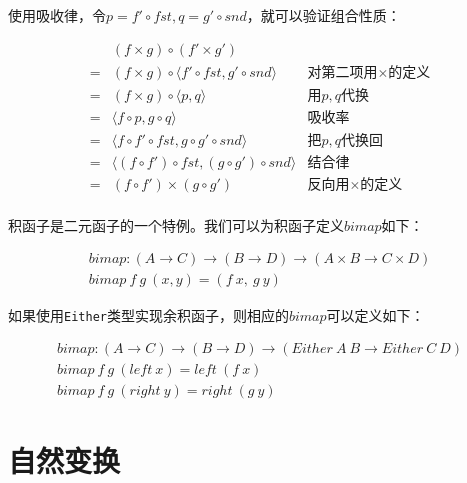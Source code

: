 \documentclass{article}
\begin{document}
\begin{mdframed}
使用吸收律，令$p = f' \circ fst, q = g' \circ snd$，就可以验证组合性质：

\[
\begin{array}{cll}
  & (f \times g) \circ (f' \times g') & \\
= & (f \times g) \circ \langle f' \circ fst, g' \circ snd \rangle & \text{对第二项用$\times$的定义} \\
= & (f \times g) \circ \langle p, q \rangle & \text{用$p, q$代换} \\
= & \langle f \circ p, g \circ q \rangle & \text{吸收率} \\
= & \langle f \circ f' \circ fst, g \circ g' \circ snd \rangle & \text{把$p, q$代换回} \\
= & \langle (f \circ f') \circ fst, (g \circ g') \circ snd \rangle & \text{结合律} \\
= & (f \circ f') \times (g \circ g') & \text{反向用$\times$的定义} \\
\end{array}
\]

\end{mdframed}

积函子是二元函子的一个特例。我们可以为积函子定义$bimap$如下：

\[
\begin{array}{l}
bimap : (A \to C) \to (B \to D) \to (A \times B \to C \times D) \\
bimap\ f\ g\ (x, y) = (f\ x,\ g\ y)
\end{array}
\]

如果使用\texttt{Either}类型实现余积函子，则相应的$bimap$可以定义如下：

\[
\begin{array}{l}
bimap : (A \to C) \to (B \to D) \to (Either\ A\ B \to Either\ C\ D) \\
bimap\ f\ g\ (left\ x) = left\ (f\ x) \\
bimap\ f\ g\ (right\ y) = right\ (g\ y)
\end{array}
\]

\begin{Exercise}
\end{Exercise}

\section{自然变换}
\end{document}
